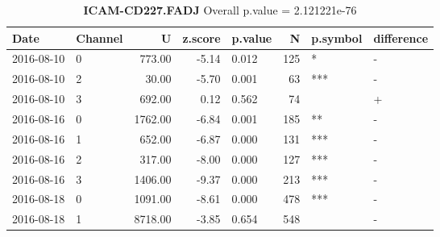\begin{table}[ht]
\caption[ICAM-CD227.FADJ]{\textbf{ICAM-CD227.FADJ} Overall p.value = 2.121221e-76}
\centering
\begin{tabular}{llrrlrll}
  \hline
Date & Channel & U & z.score & p.value & N & p.symbol & difference \\ 
  \hline
2016-08-10 & 0 & 773.00 & -5.14 & 0.012 & 125 & * & - \\ 
  2016-08-10 & 2 & 30.00 & -5.70 & 0.001 &  63 & *** & - \\ 
  2016-08-10 & 3 & 692.00 & 0.12 & 0.562 &  74 &  & + \\ 
  2016-08-16 & 0 & 1762.00 & -6.84 & 0.001 & 185 & ** & - \\ 
  2016-08-16 & 1 & 652.00 & -6.87 & 0.000 & 131 & *** & - \\ 
  2016-08-16 & 2 & 317.00 & -8.00 & 0.000 & 127 & *** & - \\ 
  2016-08-16 & 3 & 1406.00 & -9.37 & 0.000 & 213 & *** & - \\ 
  2016-08-18 & 0 & 1091.00 & -8.61 & 0.000 & 478 & *** & - \\ 
  2016-08-18 & 1 & 8718.00 & -3.85 & 0.654 & 548 &  & - \\ 
   \hline
\end{tabular}
\end{table}
